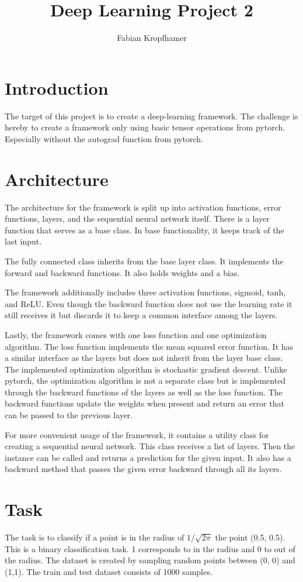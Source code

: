 \documentclass[12pt]{article}
\title{
	Deep Learning Project 2
}
\author{Fabian Kropfhamer}
\begin{document}
\maketitle


\section{Introduction}
The target of this project is to create a deep-learning framework.
The challenge is hereby to create a framework only using basic tensor operations from pytorch.
Especially without the autograd function from pytorch.


\section{Architecture}
The architecture for the framework is split up into activation functions, error functions, layers, and the sequential neural network itself.
There is a layer function that serves as a base class.
In base functionality, it keeps track of the last input.

The fully connected class inherits from the base layer class.
It implements the forward and backward functions.
It also holds weights and a bias.

The framework additionally includes three activation functions, sigmoid, tanh, and  ReLU.
Even though the backward function does not use the learning rate it still receives it but discards it to keep a common interface among the layers.

Lastly, the framework comes with one loss function and one optimization algorithm.
The loss function implements the mean squared error function.
It has a similar interface as the layers but does not inherit from the layer base class.
The implemented optimization algorithm is stochastic gradient descent. 
Unlike pytorch, the optimization algorithm is not a separate class but is implemented through the backward functions of the layers as well as the loss function.
The backward functions update the weights when present and return an error that can be passed to the previous layer.

For more convenient usage of the framework, it contains a utility class for creating a sequential neural network.
This class receives a list of layers.
Then the instance can be called and returns a prediction for the given input.
It also has a backward method that passes the given error backward through all its layers. 


\section{Task}
The task is to classify if a point is in the radius of $1/\sqrt{2\pi}$ the point (0.5, 0.5).
This is a binary classification task.
1 corresponds to in the radius and 0 to out of the radius.
The dataset is created by sampling random points between (0, 0) and (1,1).
The train and test dataset consists of 1000 samples.
\end{document}
